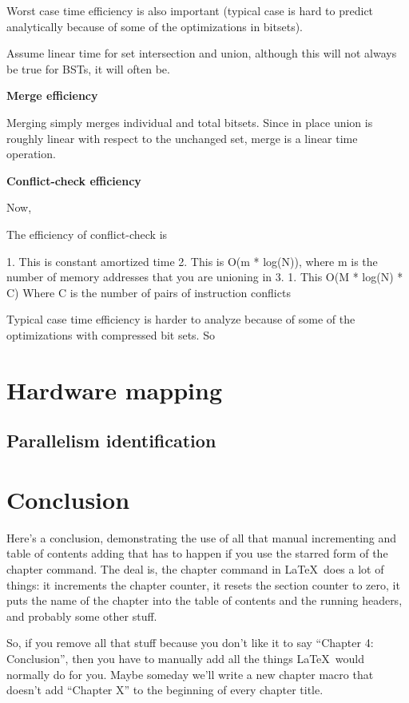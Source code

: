 \documentclass[12pt,twoside]{reedthesis}
\begin{document}
		Worst case time efficiency is also important (typical case is hard to predict analytically because of some of the optimizations in bitsets). 
		
		Assume linear time for set intersection and union, although this will not always be true for BSTs, it will often be. 
		
		\textbf{Merge efficiency}
		
		Merging simply merges individual and total bitsets. Since in place union is roughly linear with respect to the unchanged set, merge is a linear time operation. 
		
		\textbf{Conflict-check efficiency}
		
		Now, 
				
		The efficiency of conflict-check is 
		
		1. This is constant amortized time
		2. This is O(m * log(N)), where m is the number of memory addresses that you are unioning in
		3.
		1. This O(M * log(N) * C) Where C is the number of pairs of instruction conflicts

		Typical case time efficiency is harder to analyze because of some of the optimizations with compressed bit sets. So 
		
\chapter{Hardware mapping}
	\section{Parallelism identification}
	
		

\chapter*{Conclusion}
	\setcounter{chapter}{4}
	\setcounter{section}{0}

Here's a conclusion, demonstrating the use of all that manual incrementing and table of contents adding that has to happen if you use the starred form of the chapter command. The deal is, the chapter command in \LaTeX\ does a lot of things: it increments the chapter counter, it resets the section counter to zero, it puts the name of the chapter into the table of contents and the running headers, and probably some other stuff.

So, if you remove all that stuff because you don't like it to say ``Chapter 4: Conclusion'', then you have to manually add all the things \LaTeX\ would normally do for you. Maybe someday we'll write a new chapter macro that doesn't add ``Chapter X'' to the beginning of every chapter title.
\end{document}
